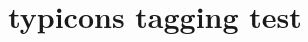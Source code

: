 \documentclass{article}
\title{typicons tagging test}
\begin{document}
\tiAdjustBrightness

\tiChevronLeftOutline

\tiFlag
\end{document}
